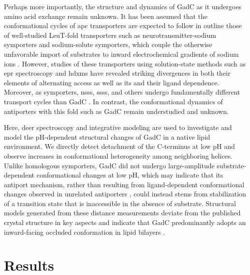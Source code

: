 Perhaps more importantly, the structure and dynamics of GadC as it undergoes amino acid exchange remain unknown. It has been assumed that the conformational cycles of \gls{apc} transporters are expected to follow in outline  those of well-studied LeuT-fold transporters such as neurotransmitter-sodium symporters and sodium-solute symporters, which couple the otherwise unfavorable import of substrates to inward electrochemical gradients of sodium ions \citep*{Kazmier2014a}. However, studies of these transporters using solution-state methods such as \gls{epr} spectroscopy \citep*{Claxton2010, Kazmier2014, Kazmier2014a, Paz2018} and \gls{hdxms} \citep*{Adhikary2017, Merkle2018, Moeller2019, Nielsen2019} have revealed striking divergences in both their elements of alternating access as well as its and their ligand dependence. Moreover, as symporters, \gls{nss}s, \gls{sss}s, and others undergo fundamentally different transport cycles than GadC \citep*{Forrest2009}. In contrast, the conformational dynamics of antiporters with this fold such as GadC remain understudied and unknown.

Here, \gls{deer} spectroscopy \citep*{Dastvan2019, Jeschke2012, Mchaourab2011} and integrative modeling \citep*{Rout2019, Tessmer2018} are used to investigate and model the pH-dependent structural changes of GadC in a native lipid environment. We directly detect detachment of the C-terminus at low pH and observe increases in conformational heterogeneity among neighboring helices. Unlike homologous symporters, GadC did not undergo large-amplitude substrate-dependent conformational changes at low pH, which may indicate that its antiport mechanism, rather than resulting from ligand-dependent conformational changes observed in unrelated antiporters \citep*{Jagessar2020, Martens2016, Masureel2014}, could instead stems from stabilization of a transition state that is inaccessible in the absence of substrate. Structural models generated from these distance measurements deviate from the published crystal structure in key aspects and indicate that GadC predominantly adopts an inward-facing occluded conformation in lipid bilayers \citep*{Errasti-Murugarren2019, Shaffer2009}.

\section{Results}

